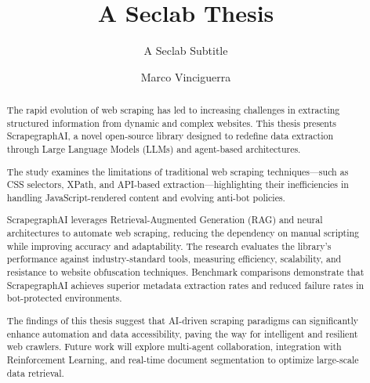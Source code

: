 \documentclass[english,master]{unibg}
\title{A Seclab Thesis}
\subtitle{A Seclab Subtitle}
\author{Marco Vinciguerra}
\begin{document}
\maketitle
\emptypage


\begin{abstract}
The rapid evolution of web scraping has led to increasing challenges in extracting structured information from dynamic and complex websites. This thesis presents ScrapegraphAI, a novel open-source library designed to redefine data extraction through Large Language Models (LLMs) and agent-based architectures. 

The study examines the limitations of traditional web scraping techniques—such as CSS selectors, XPath, and API-based extraction—highlighting their inefficiencies in handling JavaScript-rendered content and evolving anti-bot policies.

ScrapegraphAI  leverages Retrieval-Augmented Generation (RAG) and neural architectures to automate web scraping, reducing the dependency on manual scripting while improving accuracy and adaptability. The research evaluates the library's performance against industry-standard tools, measuring efficiency, scalability, and resistance to website obfuscation techniques. Benchmark comparisons demonstrate that ScrapegraphAI  achieves superior metadata extraction rates and reduced failure rates in bot-protected environments.

The findings of this thesis suggest that AI-driven scraping paradigms can significantly enhance automation and data accessibility, paving the way for intelligent and resilient web crawlers. Future work will explore multi-agent collaboration, integration with Reinforcement Learning, and real-time document segmentation to optimize large-scale data retrieval.
\end{abstract}

\emptypage
\toc
\emptypage

\clearpage
{}




\end{document}

